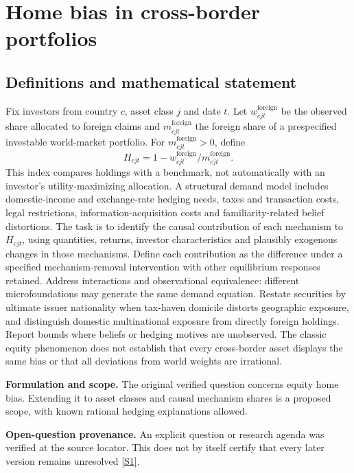 \documentclass[11pt]{article}
\newcommand{\sref}[2]{\hyperlink{source:#1:#2}{[S#2]}}
\begin{document}
\section*{Home bias in cross-border portfolios}\label{30007620}
\subsection{Definitions and mathematical statement}
Fix investors from country \(c\), asset class \(j\) and date \(t\). Let \(w_{cjt}^{\mathrm{foreign}}\) be the observed share allocated to foreign claims and \(m_{cjt}^{\mathrm{foreign}}\) the foreign share of a prespecified investable world-market portfolio. For \(m_{cjt}^{\mathrm{foreign}}>0\), define
\[H_{cjt}=1-w_{cjt}^{\mathrm{foreign}}/m_{cjt}^{\mathrm{foreign}}.\]
This index compares holdings with a benchmark, not automatically with an investor's utility-maximizing allocation. A structural demand model includes domestic-income and exchange-rate hedging needs, taxes and transaction costs, legal restrictions, information-acquisition costs and familiarity-related belief distortions. The task is to identify the causal contribution of each mechanism to \(H_{cjt}\), using quantities, returns, investor characteristics and plausibly exogenous changes in those mechanisms. Define each contribution as the difference under a specified mechanism-removal intervention with other equilibrium responses retained. Address interactions and observational equivalence: different microfoundations may generate the same demand equation. Restate securities by ultimate issuer nationality when tax-haven domicile distorts geographic exposure, and distinguish domestic multinational exposure from directly foreign holdings. Report bounds where beliefs or hedging motives are unobserved. The classic equity phenomenon does not establish that every cross-border asset displays the same bias or that all deviations from world weights are irrational.

\par\textbf{Formulation and scope.} The original verified question concerns equity home bias. Extending it to asset classes and causal mechanism shares is a proposed scope, with known rational hedging explanations allowed.

\par\textbf{Open-question provenance.} An explicit question or research agenda was verified at the source locator. This does not by itself certify that every later version remains unresolved \sref{30007620}{1}.
\end{document}
